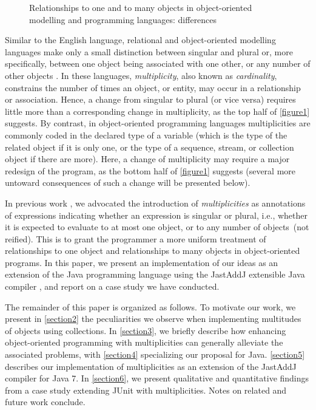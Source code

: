 {\begin{figure}
{\begin{tikzpicture}[
      arrow/.style={
        ->,
        line width=1pt
      },
      divider/.style={
        draw=blue!40
      },
      heading/.style={
        fill=black!10
      }
    ]
  \end{tikzpicture}
  }%
  \caption{Relationships to one and to many objects in
object-oriented modelling and programming languages: differences}
  \label{figure1}
\end{figure}

Similar to the English language, relational and object-oriented modelling
languages make only a small distinction between singular and plural or, more
specifically, between one object being associated with one other, or any
number of other objects \cite{ref8, ref9, ref10, ref28, ref36}. In these languages,
\emph{multiplicity}, also known as \emph{cardinality}, constrains
the number of times an object, or entity, may occur in a relationship or
association. Hence, a change from singular to plural (or vice versa)
requires little more than a corresponding change in multiplicity, as the top
half of \autoref{figure1} suggests. By contrast, in object-oriented programming
languages multiplicities are commonly coded in the declared type of a
variable (which is the type of the related object if it is only one, or the
type of a sequence, stream, or collection object if there are more). Here, a
change of multiplicity may require a major redesign of the program, as the
bottom half of \autoref{figure1} suggests (several more untoward consequences of such
a change will be presented below).

In previous work \cite{ref37}, we advocated the introduction of
\emph{multiplicities} as annotations of expressions indicating whether
an expression is singular or plural, i.e., whether it is expected to
evaluate to at most one object, or to any number of objects~(not reified).
This is to grant the programmer a more uniform treatment of relationships to
one object and relationships to many objects in object-oriented programs. In
this paper, we present an implementation of our ideas as an extension of the
Java programming language using the JastAddJ extensible Java compiler \cite{ref13},
and report on a case study we have conducted.

The remainder of this paper is organized as follows. To motivate our work,
we present in \autoref{section2} the peculiarities we observe when implementing
multitudes of objects using collections. In \autoref{section3}, we briefly describe
how enhancing object-oriented programming with multiplicities can generally
alleviate the associated problems, with \autoref{section4} specializing our proposal
for Java. \autoref{section5} describes our implementation of multiplicities as an
extension of the JastAddJ compiler for Java 7. In \autoref{section6}, we present
qualitative and quantitative findings from a case study extending JUnit with
multiplicities. Notes on related and future work conclude.

}
